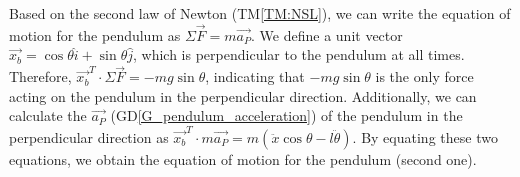 \documentclass[12pt]{article}
\newcommand{\colAwidth}{0.13\textwidth}
\newcommand{\colBwidth}{0.82\textwidth}
\newcommand{\dref}[1]{GD\ref{#1}}
\newcommand{\tref}[1]{TM\ref{#1}}
\newcounter{instnum} %
\begin{document}
Based on the second law of Newton (\tref{TM:NSL}), we can write 
the equation of motion for the pendulum as 
$\Sigma \vec{F} = m \vec{a_P}$. We define a unit vector 
$\vec{x_b} = \cos\theta \hat{i} + \sin\theta \hat{j}$, 
which is perpendicular to the pendulum at all times. 
Therefore, $\vec{x_b}^T \cdot \Sigma \vec{F} = -mg\sin\theta$, 
indicating that $-mg\sin\theta$ is the only force acting 
on the pendulum in the perpendicular direction. 
Additionally, we can calculate the $\vec{a_P}$ 
(\dref{G_pendulum_acceleration}) of the pendulum 
in the perpendicular direction as 
$\vec{x_b}^T \cdot m \vec{a_P} = m(\ddot{x}\cos\theta - l\ddot{\theta})$. 
By equating these two equations, we obtain the equation 
of motion for the pendulum (second one).

~\newline





\end{document}
